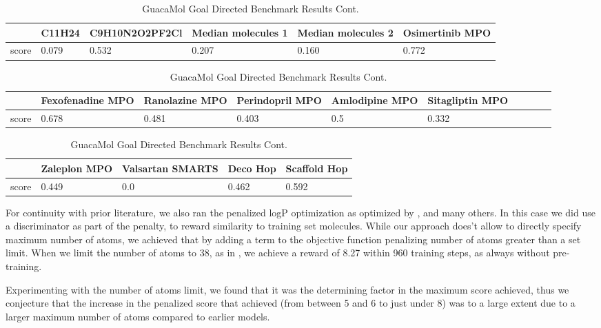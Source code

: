 \documentclass{article}
\begin{document}
\begin{table}
    \caption{GuacaMol Goal Directed Benchmark Results Cont.}
    \label{tab:gdb2}
    \centering
    \begin{tabular}{llllll}
        \toprule
        & C11H24 & C9H10N2O2PF2Cl & Median molecules 1  & Median molecules 2  & Osimertinib MPO \\
        \midrule
        score & 0.079 & 0.532 & 0.207 & 0.160 & 0.772 \\
        \bottomrule
    \end{tabular}
\end{table}

\begin{table}
    \caption{GuacaMol Goal Directed Benchmark Results Cont.}
    \label{tab:gdb3}
    \centering
    \begin{tabular}{llllllllll}
        \toprule
        & Fexofenadine MPO & Ranolazine MPO  & Perindopril MPO  & Amlodipine MPO  & Sitagliptin MPO \\
        \midrule
        score & 0.678 & 0.481 & 0.403 & 0.5 & 0.332 \\
        \bottomrule
    \end{tabular}
\end{table}

\begin{table}
    \caption{GuacaMol Goal Directed Benchmark Results Cont.}
    \label{tab:gdb4}
    \centering
    \begin{tabular}{lllll}
        \toprule
        & Zaleplon MPO  & Valsartan SMARTS & Deco Hop & Scaffold Hop \\
        \midrule
        score & 0.449 & 0.0 & 0.462 & 0.592 \\
        \bottomrule
    \end{tabular}
\end{table}
For continuity with prior literature, we also ran the penalized logP optimization as optimized by \cite{kusner2017, you2018}, and many others. In this case we did use a discriminator as part of the penalty, to reward similarity to training set molecules. While our approach does't allow to directly specify maximum number of atoms, we achieved that by adding a term to the objective function penalizing number of atoms greater than a set limit. When we limit the number of atoms to 38, as in \cite{you2018}, we achieve a reward of 8.27 within 960 training steps, as always without pre-training.

Experimenting with the number of atoms limit, we found that it was the determining factor in the maximum score achieved, thus we conjecture that the increase in the penalized score that \cite{you2018} achieved (from between 5 and 6 to just under 8) was to a large extent due to a larger maximum number of atoms compared to earlier models.
\end{document}
